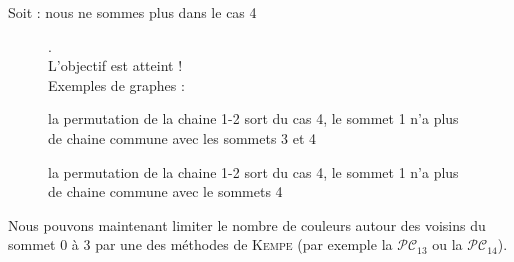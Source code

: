 \documentclass[french]{report}
\begin{document}
\begin{adjustwidth}{3.5em}{0pt}
\begin{description}
\item[Soit : nous ne sommes plus dans le cas 4].\\
L’objectif est atteint !\\
Exemples de graphes :
\end{description}
\FloatBarrier
\begin{figure}[!ht]\centering
	\begin{changemargin}{-3cm}{-3cm}
		\begin{center}
			
			\hspace{15pt}
			
		\end{center}
		\end{changemargin}
	\begin{changemargin}{3cm}{0cm}
	\caption{la permutation de la chaine 1-2 sort du cas 4, le sommet 1 n'a plus de chaine commune avec les sommets 3 et 4}\label{fig:cas4_etape1_4}
\end{changemargin}	
\end{figure}	
\FloatBarrier
\begin{figure}[!ht]\centering
	\begin{changemargin}{0cm}{-3cm}
		\begin{center}
			
			\hspace{15pt}
			
		\end{center}
	\end{changemargin}
	\begin{changemargin}{3cm}{0cm}
	\caption{la permutation de la chaine 1-2 sort du cas 4, le sommet 1 n'a plus de chaine commune avec le sommets 4}\label{fig:cas4_etape1_5}
	\end{changemargin}
\end{figure}	
\FloatBarrier
Nous pouvons maintenant limiter le nombre de couleurs autour des voisins du sommet 0 à 3 par une des méthodes de \textsc{Kempe} (par exemple la $\mathcal{PC}_{13}$ ou la $\mathcal{PC}_{14}$).\\
\end{adjustwidth}
\end{document}
